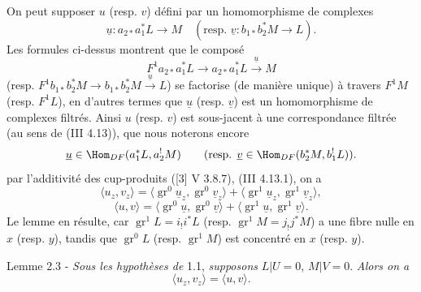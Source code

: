 On peut supposer $u$ (resp. $v$) défini par un homomorphisme de complexes
\[
\underline{u}:a_{2*}a_1^*L\longrightarrow M
\quad
(\text{resp. }\underline{v}:b_{1*}b_2^*M\longrightarrow L).
\]
Les formules ci-dessus montrent que le composé
\[
F^1a_{2*}a_1^*L\longrightarrow a_{2*}a_1^*L\xrightarrow{\underline{u}}M
\]
(resp. $F^1b_{1*}b_2^*M\to b_{1*}b_2^*M\xrightarrow{\underline{u}}L$) se factorise (de manière unique) à travers $F^1M$ (resp. $F^1L$), en d'autres termes que $\underline{u}$ (resp. $\underline{v}$) est un homomorphisme de complexes filtrés. Ainsi $u$ (resp. $v$) est sous-jacent à une correspondance filtrée (au sens de (III 4.13)), que nous noterons encore
\[
\underline{u}\in\Hom_{DF}(a_1^*L,a_2^!M)\qquad
(\text{resp. }\underline{v}\in\Hom_{DF}(b_2^*M,b_1^!L)).
\]
par l'additivité des cup-produits ([3] V 3.8.7), (III 4.13.1), on a
\[
\langle u_z,v_z\rangle
 =\langle \operatorname{gr}^0\underline{u}_z,\operatorname{gr}^0\underline{v}_z\rangle
 +\langle \operatorname{gr}^1\underline{u}_z,\operatorname{gr}^1\underline{v}_z\rangle,
\]
\[
\langle u,v\rangle
 =\langle \operatorname{gr}^0\underline{u},\operatorname{gr}^0\underline{v}\rangle
 +\langle \operatorname{gr}^1\underline{u},\operatorname{gr}^1\underline{v}\rangle.
\]
Le lemme en résulte, car $\operatorname{gr}^1L=i_!i^*L$ (resp. $\operatorname{gr}^1M=j_!j^*M$) a une fibre nulle en $x$ (resp. $y$), tandis que $\operatorname{gr}^0L$ (resp. $\operatorname{gr}^1M$) est concentré en $x$ (resp. $y$).

\begin{statement}{Lemme 2.3 -}
\emph{Sous les hypothèses de} 1.1, \emph{supposons} $L|U=0$, $M|V=0$. \emph{Alors on a}
\[
\langle u_z,v_z\rangle=\langle u,v\rangle .
\]
\end{statement}

